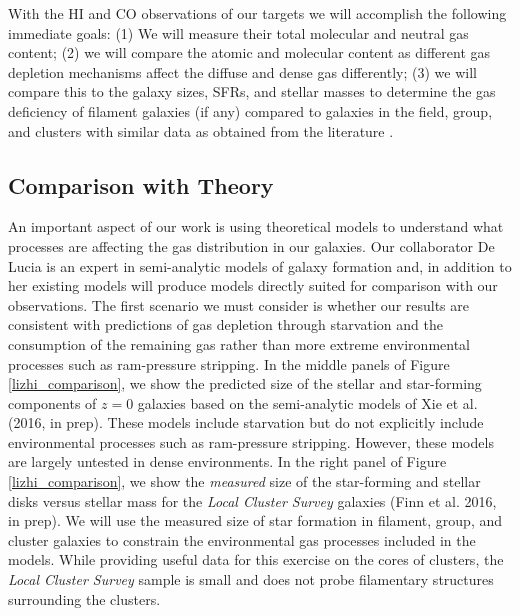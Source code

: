 \documentclass[11pt, preprint]{aastex}
\begin{document}
{With the HI and CO observations of our targets we will accomplish the following immediate goals: 
(1) We will measure their total molecular and neutral gas content; (2)
we will compare the atomic and molecular content as different gas
depletion mechanisms affect the diffuse and dense gas differently; (3)
we will compare this to the galaxy sizes, SFRs, and stellar masses to
determine the gas deficiency of filament galaxies (if any) compared to
galaxies in the field, group, and clusters with similar data as
obtained from the literature 
\citep[e.g.][]{Ciesla12, davies10}.



\vspace*{-1cm}
\subsection{Comparison with Theory}
\vspace*{-.4cm}

An important aspect of our work is using theoretical models to understand what processes are affecting the gas distribution in our galaxies.  Our collaborator De Lucia is an expert in semi-analytic models of galaxy formation and, in addition to her existing models \citep{Zoldan16} will produce models directly suited for comparison with our observations.  The first scenario we must consider is whether our results are
consistent with predictions of gas depletion through starvation and
the consumption of the remaining gas
rather than more extreme environmental processes such as ram-pressure stripping.
In the middle panels of Figure \ref{lizhi_comparison}, we show the predicted size of the
stellar and star-forming components of $z = 0$ galaxies based on the
semi-analytic models of Xie et al. (2016, in prep).  These models
include starvation but do not explicitly include environmental
processes such as ram-pressure stripping.  However, these models are largely untested in dense environments.  In the right panel of
Figure \ref{lizhi_comparison}, we show the {\it measured} size of the
star-forming and stellar disks versus stellar mass for the {\it Local
  Cluster Survey} galaxies (Finn et al. 2016, in prep).  We will use the measured size of star formation in filament, group, and cluster galaxies to constrain the environmental gas processes included in the models.    
While providing useful data for this exercise on the cores of clusters, the {\it Local Cluster Survey} sample is small and does not probe filamentary structures surrounding the clusters.


}
\end{document}
